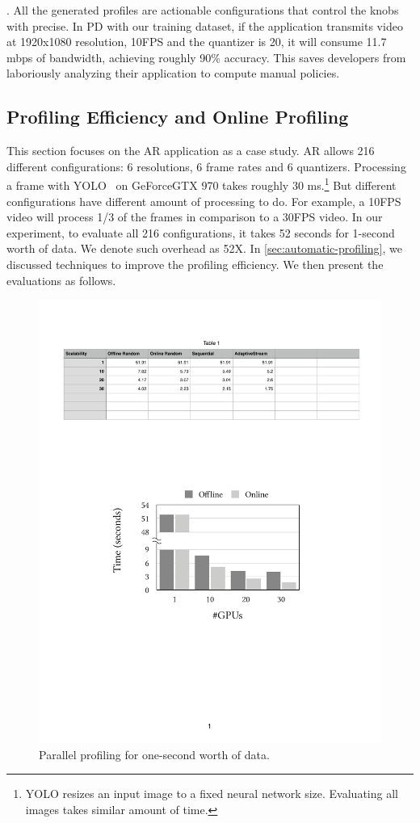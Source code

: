 . All the generated profiles are actionable
configurations that control the knobs with precise. In PD with our training
dataset, if the application transmits video at 1920x1080 resolution, 10FPS and
the quantizer is 20, it will consume 11.7 mbps of bandwidth, achieving roughly
90\% accuracy. This saves developers from laboriously analyzing their
application to compute manual policies.

\subsection{Profiling Efficiency and Online Profiling}
\label{sec:online-profiling}

This section focuses on the AR application as a case study. AR allows 216
different configurations: 6 resolutions, 6 frame rates and 6
quantizers. Processing a frame with YOLO~\cite{redmon2016yolo9000} on
GeForce\textregistered\space GTX 970 takes roughly 30 ms.\footnote{YOLO resizes
  an input image to a fixed neural network size. Evaluating all images takes
  similar amount of time.} But different configurations have different amount of
processing to do. For example, a 10FPS video will process 1/3 of the frames in
comparison to a 30FPS video. In our experiment, to evaluate all 216
configurations, it takes 52 seconds for 1-second worth of data. We denote such
overhead as 52X. In \autoref{sec:automatic-profiling}, we discussed techniques
to improve the profiling efficiency. We then present the evaluations as follows.

\begin{figure}
  \centering
  \includegraphics[width=0.9\columnwidth]{figures/parallel.pdf}
  \caption{Parallel profiling for one-second worth of data.}
  \label{fig:parallel}
\end{figure}

